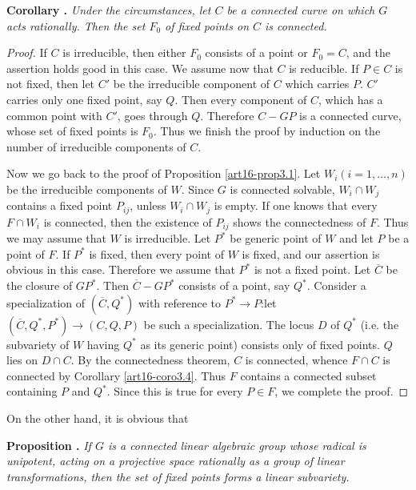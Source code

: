 \medskip
\noindent
{\bf Corollary .\label{art16-coro3.4}}
{\em Under the circumstances, let $C$ be a connected curve on which $G$ acts rationally. Then the set $F_{0}$ of fixed points on $C$ is connected.}

\begin{proof}
If $C$ is irreducible, then either $F_{0}$ consists of a point or $F_{0}=C$, and the assertion holds good in this case. We assume now that $C$ is reducible. If $P\in C$ is not fixed, then let $C'$ be the irreducible component of $C$ which carries $P$. $C'$ carries only one fixed point, say $Q$. Then every component of $C$, which has a common point with $C'$, goes through $Q$. Therefore $C-GP$ is a connected curve, whose set of fixed points is $F_{0}$. Thus we finish the proof by induction on the number of irreducible components of $C$.

Now we go back to the proof of Proposition \ref{art16-prop3.1}. Let $W_{i}(i=1,\ldots,n)$ be the irreducible components of $W$. Since $G$ is connected solvable, $W_{i}\cap W_{j}$ contains a fixed point $P_{ij}$, unless $W_{i}\cap W_{j}$ is empty. If one knows that every $F\cap W_{i}$ is connected, then the existence of $P_{ij}$ shows the connectedness of $F$. Thus we may assume that $W$ is irreducible. Let $P^{*}$ be generic point of $W$ and let $P$ be a point of $F$. If $P^{*}$ is fixed, then every point of $W$ is fixed, and our assertion is obvious in this case. Therefore we assume that $P^{*}$ is not a fixed point. Let $\overline{C}$ be the closure of $GP^{*}$. Then $\overline{C}-GP^{*}$ consists of a point, say $Q^{*}$. Consider a specialization of $(\overline{C},Q^{*})$ with reference to $P^{*}\to P$:\pageoriginale let $(\overline{C},Q^{*},P^{*})\to (C,Q,P)$ be such a specialization. The locus $D$ of $Q^{*}$ (i.e. the subvariety of $W$ having $Q^{*}$ as its generic point) consists only of fixed points. $Q$ lies on $D\cap C$. By the connectedness theorem, $C$ is connected, whence $F\cap C$ is connected by Corollary \ref{art16-coro3.4}. Thus $F$ contains a connected subset containing $P$ and $Q^{*}$. Since this is true for every $P\in F$, we complete the proof.
\end{proof}

On the other hand, it is obvious that

\medskip
\noindent
{\bf Proposition .\label{art16-prop3.5}}
{\em If $G$ is a connected linear algebraic group whose radical is unipotent, acting on a projective space rationally as a group of linear transformations, then the set of fixed points forms a linear subvariety.}
\smallskip

